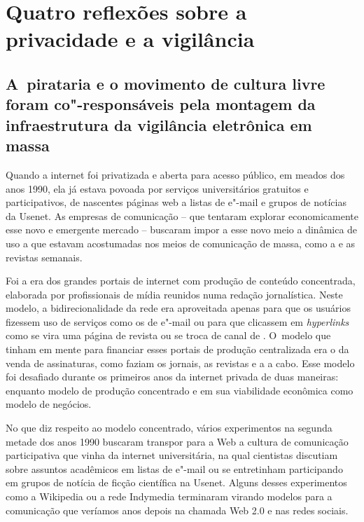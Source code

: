 \chapter{Quatro reflexões sobre a privacidade e a
vigilância}\label{quatro-reflexuxf5es-sobre-a-privacidade-e-a-vigiluxe2ncia}

\section{A~pirataria e o movimento de cultura livre foram co"-responsáveis
pela montagem da infraestrutura da vigilância eletrônica em massa}

Quando a internet foi privatizada e aberta para acesso público, em
meados dos anos 1990, ela já estava povoada por serviços universitários
gratuitos e participativos, de nascentes páginas web a listas de e"-mail
e grupos de notícias da Usenet. As empresas de comunicação -- que
tentaram explorar economicamente esse novo e emergente mercado --
buscaram impor a esse novo meio a dinâmica de uso a que estavam
acostumadas nos meios de comunicação de massa, como a  e as revistas
semanais.

Foi a era dos grandes portais de internet com produção de conteúdo
concentrada, elaborada por profissionais de mídia reunidos numa redação
jornalística. Neste modelo, a bidirecionalidade da rede era aproveitada
apenas para que os usuários fizessem uso de serviços como os de e"-mail
ou para que clicassem em \emph{hyperlinks} como se vira uma página de
revista ou se troca de canal de . O~modelo que tinham em mente para
financiar esses portais de produção centralizada era o da venda de
assinaturas, como faziam os jornais, as revistas e a  a cabo. Esse
modelo foi desafiado durante os primeiros anos da internet privada de
duas maneiras: enquanto modelo de produção concentrado e em sua
viabilidade econômica como modelo de negócios.

No que diz respeito ao modelo concentrado, vários experimentos na
segunda metade dos anos 1990 buscaram transpor para a Web a cultura de
comunicação participativa que vinha da internet universitária, na qual
cientistas discutiam sobre assuntos acadêmicos em listas de e"-mail ou se
entretinham participando em grupos de notícia de ficção científica na
Usenet. Alguns desses experimentos como a Wikipedia ou a rede Indymedia
terminaram virando modelos para a comunicação que veríamos anos depois
na chamada Web 2.0 e nas redes sociais.

